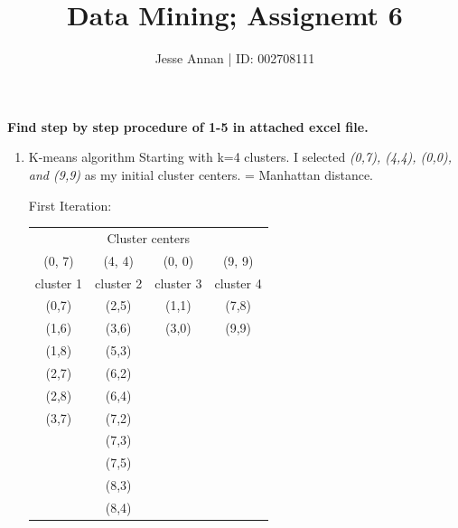 \documentclass[10pt,a4paper]{article}
\title{Data Mining; Assignemt 6}
\author{Jesse Annan \hspace{0.5cm} | \hspace{0.5cm} ID: 002708111}
\begin{document}
	\maketitle
	
	\clearpage
	
	\textbf{Find step by step procedure of 1-5 in attached excel file.}
	\begin{enumerate}
		\item K-means algorithm \newline
			Starting with k=4 clusters. I selected \textit{(0,7), (4,4), (0,0), \textrm{and} (9,9)} as my initial cluster centers. \newline
			 = Manhattan distance. \newline
			
			First Iteration:
			\begin{table}[h!]
				\centering
				\begin{tabular}{cccc}
					\toprule
					\multicolumn{4}{c}{Cluster centers} \\
					(0, 7) & (4, 4) & (0, 0) & (9, 9) \\
					cluster 1 &	cluster 2 &	cluster 3 & cluster 4 \\ \midrule
					(0,7) &	(2,5) &	(1,1) & (7,8) \\
					(1,6) &	(3,6) &	(3,0) &	(9,9) \\
					(1,8) &	(5,3) & & \\		
					(2,7) &	(6,2) & & \\		
					(2,8) & (6,4) & & \\		
					(3,7) & (7,2) & & \\		
					& (7,3) & & \\		
					& (7,5) & & \\	
					& (8,3) & & \\
					& (8,4) & & \\
					\bottomrule					
				\end{tabular}
			\end{table}
		

\end{enumerate}
\end{document}
